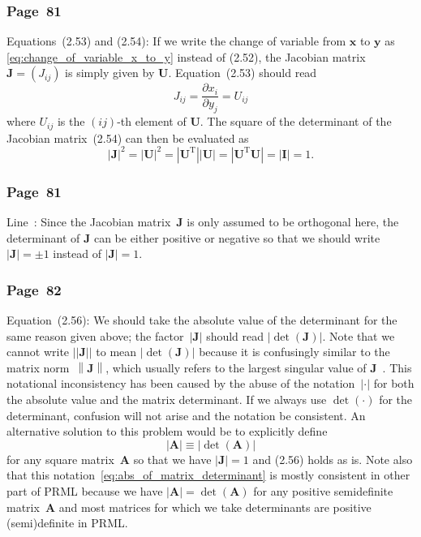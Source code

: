 \documentclass[12pt,a4paper]{article}
\newcommand{\erratum}[1]{\subsubsection*{#1}}
\begin{document}
\erratum{Page~81}
Equations~(2.53) and (2.54):
If we write the change of variable from $\mathbf{x}$ to $\mathbf{y}$ as
\eqref{eq:change_of_variable_x_to_y} instead of (2.52),
the Jacobian matrix~$\mathbf{J} = \left( J_{ij} \right)$ is simply given by $\mathbf{U}$.
Equation~(2.53) should read
\begin{equation}
J_{ij} = \frac{\partial x_i}{\partial y_j} = U_{ij}
\end{equation}
where $U_{ij}$ is the $(ij)$-th element of $\mathbf{U}$.
The square of the determinant of the Jacobian matrix~(2.54) can then be evaluated as
\begin{equation}
\left| \mathbf{J} \right|^{2} = \left| \mathbf{U} \right|^{2}
= \left| \mathbf{U}^{\operatorname{T}} \right| \left| \mathbf{U} \right|
= \left| \mathbf{U}^{\operatorname{T}} \mathbf{U} \right|
= \left| \mathbf{I} \right| = 1.
\end{equation}

\erratum{Page~81}
Line~:
Since the Jacobian matrix~$\mathbf{J}$ is only assumed to be orthogonal here,
the determinant of $\mathbf{J}$ can be either positive or negative so that
we should write $\left| \mathbf{J} \right| = \pm 1$
instead of $\left| \mathbf{J} \right| = 1$.

\erratum{Page~82}
Equation~(2.56):
We should take the absolute value of the determinant for the same reason given above;
the factor~$\left| \mathbf{J} \right|$ should read
$\left| \operatorname{det}\left( \mathbf{J} \right) \right|$.
Note that we cannot write $\left|\left| \mathbf{J} \right|\right|$ to mean
$\left| \operatorname{det}\left( \mathbf{J} \right) \right|$
because it is confusingly similar to the matrix norm~$\left\| \mathbf{J} \right\|$,
which usually refers to the largest singular value of $\mathbf{J}$~\citep{GvL:MC}.
This notational inconsistency has been caused by the abuse of the notation~$|\cdot|$ for
both the absolute value and the matrix determinant.
If we always use $\operatorname{det}(\cdot)$ for the determinant, confusion will not arise
and the notation be consistent.
An alternative solution to this problem would be to explicitly define
\begin{equation}
\left| \mathbf{A} \right| \equiv \left| \operatorname{det}\left( \mathbf{A} \right) \right|
\label{eq:abs_of_matrix_determinant}
\end{equation}
for any square matrix~$\mathbf{A}$ so that
we have $\left|\mathbf{J}\right| = 1$ and (2.56) holds as is.
Note also that this notation~\eqref{eq:abs_of_matrix_determinant} is mostly consistent
in other part of PRML because we have
$\left| \mathbf{A} \right| = \operatorname{det}\left( \mathbf{A} \right)$ for any positive
semidefinite matrix~$\mathbf{A}$ and
most matrices for which we take determinants are positive (semi)definite in PRML.
\end{document}
